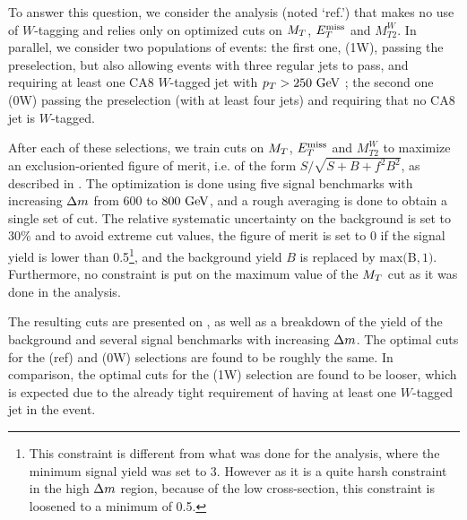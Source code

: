     To answer this question, we consider the analysis (noted `ref.') that makes
    no use of $W$-tagging
    and relies only on optimized cuts on $M_T$, $E_T^\text{miss}$ and $M_{T2}^{W}$. In parallel,
    we consider two populations of events: the first one, (1W), passing the preselection,
    but also allowing events with three regular jets to pass, and requiring at least
    one CA8 $W$-tagged jet with $p_T > 250~\text{GeV}$ ; the second one (0W) passing the
    preselection (with at least four jets) and requiring that no CA8 jet is $W$-tagged.

    After each of these selections, we train cuts on $M_T$, $E_T^\text{miss}$ and $M_{T2}^{W}$
    to maximize an exclusion-oriented figure of merit, i.e. of the form
    $S/\sqrt{S+B+f^2 B^2}$, as described in . The
    optimization is done using five signal benchmarks with increasing $\Delta m$ from
    $600$ to $800~\text{GeV}$, and a rough averaging is done to obtain a single set of cut.
    The relative systematic uncertainty on the background is set to 30\% and to avoid
    extreme cut values, the figure of merit is set to 0 if the signal yield is
    lower than 0.5\footnote{This constraint is different from what was done for
    the analysis, where the minimum signal yield was set to 3. However as it is
    a quite harsh constraint in the high $\Delta m$ region, because of the low
    cross-section, this constraint is loosened to a minimum of 0.5.}, and the
    background yield $B$ is replaced by $\text{max}($B$,1)$. Furthermore, no
    constraint is put on the maximum value of the $M_T$ cut as it was done in the
    analysis.

    The resulting cuts are
    presented on , as well as a breakdown of the
    yield of the background and several signal benchmarks with increasing $\Delta m$.
    The optimal cuts for the (ref) and (0W) selections are found to be roughly
    the same. In comparison, the optimal cuts for the (1W) selection are found
    to be looser, which is expected due to the already tight requirement of having
    at least one $W$-tagged jet in the event.

